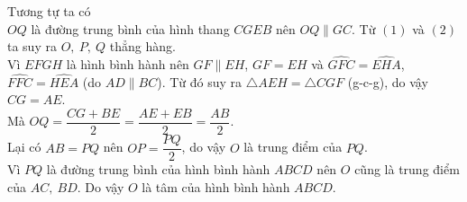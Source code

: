\begin{vd}
{{
}\noindent
Tương tự ta có\\
$ OQ $ là đường trung bình của hình thang $ CGEB $ nên $ OQ\parallel GC $.\noindent
Từ $ (1) $ và $ (2) $ ta suy ra $ O,\ P,\ Q $ thẳng hàng.\\
Vì $ EFGH $ là hình bình hành nên $ GF\parallel EH $, $ GF=EH $ và $ \widehat{GFC}=\widehat{EHA} $, $ \widehat{FFC}=\widehat{HEA} $ (do $ AD\parallel BC $). Từ đó suy ra $ \triangle AEH=\triangle CGF $ (g-c-g), do vậy $ CG=AE $.\\
Mà $ OQ=\dfrac{CG+BE}{2}=\dfrac{AE+EB}{2}=\dfrac{AB}{2} $.\\
Lại có $ AB=PQ $ nên $ OP=\dfrac{PQ}{2} $, do vậy $ O $ là trung điểm của $ PQ $.\\
Vì $ PQ $ là đường trung bình của hình bình hành $ ABCD $ nên $ O $ cũng là trung điểm của $ AC,\ BD $. Do vậy $ O $ là tâm của hình bình hành $ ABCD $.
}
\end{vd}
